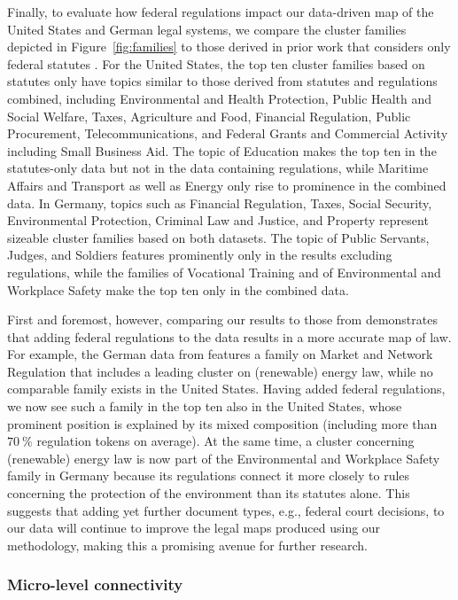 Finally, to evaluate how federal regulations impact our data-driven map of the United States and German legal systems, we compare the cluster families depicted in Figure~\ref{fig:families} to those derived in prior work that considers only federal statutes \cite{katz2020}.
For the United States, the top ten cluster families based on statutes only have topics similar to those derived from statutes and regulations combined, 
including Environmental and Health Protection, Public Health and Social Welfare, Taxes, Agriculture and Food, Financial Regulation, Public Procurement, Telecommunications, and Federal Grants and Commercial Activity including Small Business Aid.
The topic of Education makes the top ten in the statutes-only data but not in the data containing regulations, while Maritime Affairs and Transport as well as Energy only rise to prominence in the combined data.
In Germany, topics such as Financial Regulation, Taxes, Social Security, Environmental Protection, Criminal Law and Justice, and Property represent sizeable cluster families based on both datasets. 
The topic of Public Servants, Judges, and Soldiers features prominently only in the results excluding regulations, while the families of Vocational Training and of Environmental and Workplace Safety make the top ten only in the combined data.

First and foremost, however, comparing our results to those from \cite{katz2020} demonstrates that adding federal regulations to the data results in a more accurate map of law.
For example, the German data from \cite{katz2020} features a family on Market and Network Regulation that includes a leading cluster on (renewable) energy law, while no comparable family exists in the United States.
Having added federal regulations, we now see such a family in the top ten also in the United States, whose prominent position is explained by its mixed composition (including more than $70~\%$ regulation tokens on average).
At the same time, a cluster concerning (renewable) energy law is now part of the Environmental and Workplace Safety family in Germany because its regulations connect it more closely to rules concerning the protection of the environment than its statutes alone.
This suggests that adding yet further document types, e.g., federal court decisions, to our data will continue to improve the legal maps produced using our methodology, making this a promising avenue for further research.

\vspace*{6pt}
\subsubsection{Micro-level connectivity}
\label{subsubsec:results:connectivity:micro}

